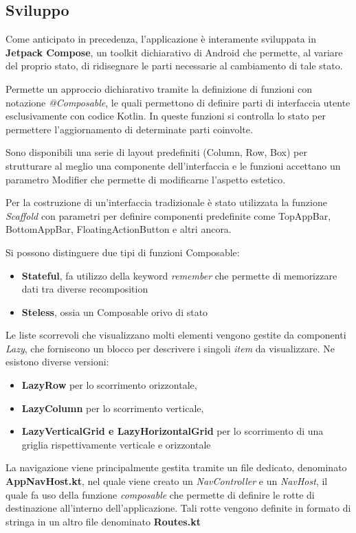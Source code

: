 \documentclass{article}
\begin{document}
\subsection{Sviluppo}
Come anticipato in precedenza, l'applicazione è interamente sviluppata in \textbf{Jetpack Compose}, un toolkit dichiarativo di Android che permette, al variare del proprio stato, di ridisegnare le parti necessarie al cambiamento di tale stato.

Permette un approccio dichiarativo tramite la definizione di funzioni con notazione \textit{@Composable}, le quali permettono di definire parti di interfaccia utente esclusivamente con codice Kotlin. 
In queste funzioni si controlla lo stato per permettere l'aggiornamento di determinate parti coinvolte.

Sono disponibili una serie di layout predefiniti (Column, Row, Box) per strutturare al meglio una componente dell'interfaccia e le funzioni accettano un parametro Modifier che permette di modificarne l'aspetto estetico.

Per la costruzione di un'interfaccia tradizionale è stato utilizzata la funzione \textit{Scaffold} con parametri per definire componenti predefinite come TopAppBar, BottomAppBar, FloatingActionButton e altri ancora.

Si possono distinguere due tipi di funzioni Composable:
\begin{itemize}
  \item \textbf{Stateful}, fa utilizzo della keyword \textit{remember} che permette di memorizzare dati tra diverse recomposition
  \item \textbf{Steless}, ossia un Composable orivo di stato
\end{itemize}

Le liste scorrevoli che visualizzano molti elementi vengono gestite da componenti \textit{Lazy}, che forniscono un blocco per descrivere i singoli \textit{item} da visualizzare.  
Ne esistono diverse versioni:
\begin{itemize}
  \item \textbf{LazyRow} per lo scorrimento orizzontale,
  \item \textbf{LazyColumn} per lo scorrimento verticale,
  \item \textbf{LazyVerticalGrid e LazyHorizontalGrid} per lo scorrimento di una griglia rispettivamente verticale e orizzontale
\end{itemize}

La navigazione viene principalmente gestita tramite un file dedicato, denominato \textbf{AppNavHost.kt},
nel quale viene creato un \textit{NavController} e un \textit{NavHost},
il quale fa uso della funzione \textit{composable} che permette di definire le rotte di destinazione
all'interno dell'applicazione. Tali rotte vengono definite in formato di stringa in un altro file denominato \textbf{Routes.kt} 
\end{document}
